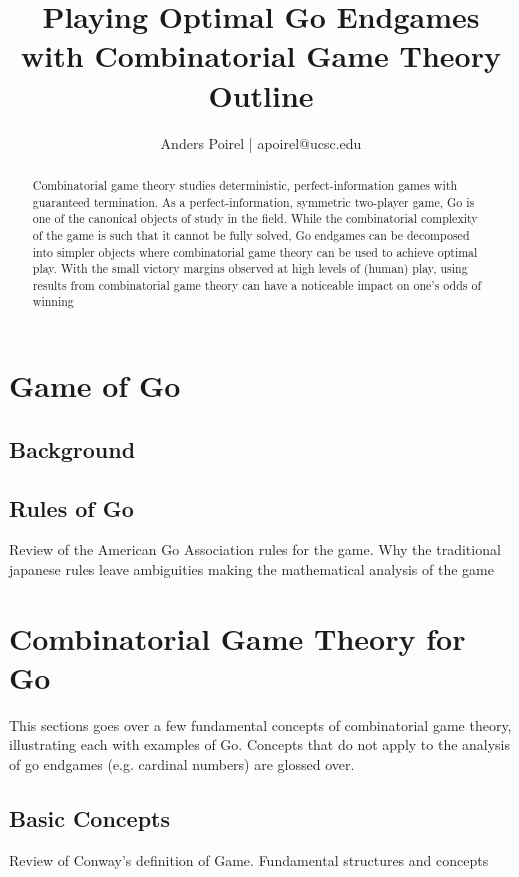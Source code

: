 \documentclass{article}[12pt]
\title{
    Playing Optimal Go Endgames with Combinatorial Game Theory \\
    \large Outline
}
\date{}
\author{Anders Poirel | apoirel@ucsc.edu}
\begin{document}
    
\maketitle

\begin{abstract}
    Combinatorial game theory studies deterministic, perfect-information 
    games with guaranteed termination. As a perfect-information, symmetric 
    two-player game, Go is one of the canonical objects of study in the field.
    While the combinatorial complexity of the game is such that it cannot be fully solved,
    Go endgames can be decomposed into simpler objects where combinatorial game theory can 
    be used to achieve optimal play. With the small victory margins observed at high
    levels of (human) play, using results from combinatorial game theory can have a 
    noticeable impact on one's odds of winning 
\end{abstract}

\tableofcontents

\section{Game of Go}

\subsection{Background}

\subsection{Rules of Go}
Review of the American Go Association rules for the game. 
Why the traditional japanese rules leave ambiguities making the 
mathematical analysis of the game 

\section{Combinatorial Game Theory for Go}

This sections goes over a few fundamental concepts of combinatorial game 
theory, illustrating each with examples of Go. Concepts that do not apply 
to the analysis of go endgames (e.g. cardinal numbers) are glossed over.

\subsection{Basic Concepts}
Review of Conway's definition of Game. Fundamental structures and 
concepts
\end{document}
